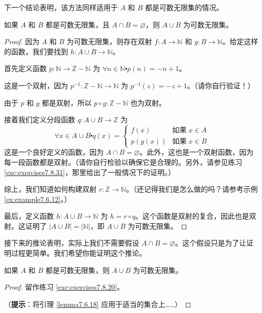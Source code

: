 下一个结论表明，该方法同样适用于 $A$ 和 $B$ 都是可数无限集的情况。

\begin{lemma}\label{lemma7.6.18}
    如果 $A$ 和 $B$ 都是可数无限集，且 $A \cap B = \varnothing$，则 $A \cup B$ 为可数无限集。
\end{lemma}

\begin{proof}
    因为 $A$ 和 $B$ 为可数无限集，则存在双射 $ f : A \to \mathbb{N}$ 和 $g : B \to \mathbb{N}$。给定这样的函数，我们要找到 $h : A \cup B \to \mathbb{N}$。

    首先定义函数 $p : \mathbb{N} \to \mathbb{Z} - \mathbb{N}$ 为 $\forall n \in \mathbb{N} \centerdot p(n) = -n + 1$。

    这是一个双射，因为 $p^{-1} : \mathbb{Z} - \mathbb{N} \to \mathbb{N}$ 为 $p^{-1}(z) = -z + 1$。（请你自行验证！）

    由于 $p$ 和 $g$ 都是双射，所以 $p \circ g : \mathbb{Z} - \mathbb{N}$ 也为双射。

    接着我们定义分段函数 $q : A \cup B \to \mathbb{Z}$ 为
    \[\forall x \in A \cup B \centerdot q(x) = \begin{cases}
            f(x)    & \text{如果}\; x \in A \\
            p(g(x)) & \text{如果}\; x \in B
        \end{cases}\]
    这是一个良好定义的函数，因为 $A \cap B = \varnothing$。此外，这也是一个双射函数，因为每一段函数都是双射。（请你自行检验以确保它是合理的。另外，请参见练习 \ref{exc:exercises7.8.31}，那里给出了一般情况下的证明。）

    综上，我们知道如何构建双射 $r : \mathbb{Z} \to \mathbb{N}$。（还记得我们是怎么做的吗？请参考示例 \ref{ex:example7.6.12}。）

    最后，定义函数 $h : A \cup B \to \mathbb{N}$ 为 $h = r \circ q$。这个函数是双射的复合，因此也是双射。这证明了 $ |A \cup B| = |\mathbb{N}|$，即 $A \cup B$ 为可数无限集。
\end{proof}

接下来的推论表明，实际上我们不需要假设 $A \cap B = \varnothing$。这个假设只是为了让证明过程更简单。我们希望你能证明这个推论。

\begin{corollary}\label{corollary7.6.19}
    如果 $A$ 和 $B$ 都是可数无限集，则 $A \cup B$ 为可数无限集。
\end{corollary}

\begin{proof}
    留作练习 \ref{exc:exercises7.8.20}。

    （\textbf{提示}：将引理 \ref{lemma7.6.18} 应用于适当的集合上……）
\end{proof}

